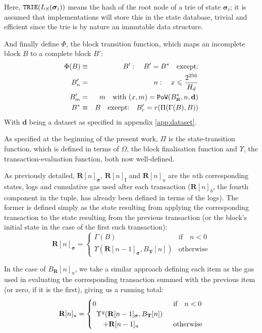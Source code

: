 \documentclass[9pt,oneside]{amsart}
\newcommand{\hcancel}[1]{%
    \tikz[baseline=(tocancel.base)]{
        \node[inner sep=0pt,outer sep=0pt] (tocancel) {#1};
        \draw[black] (tocancel.south west) -- (tocancel.north east);
    }%
}%
\begin{document}
\begin{multicols}{2}
Here, $\mathtt{\small TRIE}(L_S(\boldsymbol{\sigma}_i))$ means the hash of the root node of a trie of state $\boldsymbol{\sigma}_i$; it is assumed that implementations will store this in the state database, trivial and efficient since the trie is by nature an immutable data structure.

And finally define $\Phi$, the block transition function, which maps an incomplete block $B$ to a complete block $B'$:
\begin{eqnarray}
\Phi(B) & \equiv & B': \quad B' = B^* \quad \text{except:} \\
B'_n & = & n: \quad x \leqslant \frac{2^{256}}{H_d} \\
B'_m & = & m \quad \text{with } (x, m) = \mathtt{PoW}(B^*_{\hcancel{n}}, n, \mathbf{d}) \\
B^* & \equiv & B \quad \text{except:} \quad B'_r = r(\Pi(\Gamma(B), B))
\end{eqnarray}
With $\mathbf{d}$ being a dataset as specified in appendix \ref{app:dataset}.

As specified at the beginning of the present work, $\Pi$ is the state-transition function, which is defined in terms of $\Omega$, the block finalisation function and $\Upsilon$, the transaction-evaluation function, both now well-defined.

As previously detailed, $\mathbf{R}[n]_{\boldsymbol{\sigma}}$, $\mathbf{R}[n]_\mathbf{l}$ and $\mathbf{R}[n]_u$ are the $n$th corresponding states, logs and cumulative gas used after each transaction ($\mathbf{R}[n]_b$, the fourth component in the tuple, has already been defined in terms of the logs). The former is defined simply as the state resulting from applying the corresponding transaction to the state resulting from the previous transaction (or the block's initial state in the case of the first such transaction):
\begin{equation}
\mathbf{R}[n]_{\boldsymbol{\sigma}} = \begin{cases} \Gamma(B) & \text{if} \quad n < 0 \\ \Upsilon(\mathbf{R}[n - 1]_{\boldsymbol{\sigma}}, B_\mathbf{T}[n]) & \text{otherwise} \end{cases}
\end{equation}

In the case of $B_\mathbf{R}[n]_u$, we take a similar approach defining each item as the gas used in evaluating the corresponding transaction summed with the previous item (or zero, if it is the first), giving us a running total:
\begin{equation}
\mathbf{R}[n]_u = \begin{cases} 0 & \text{if} \quad n < 0 \\
\begin{array}[b]{l}
\Upsilon^g(\mathbf{R}[n - 1]_{\boldsymbol{\sigma}}, B_\mathbf{T}[n])\\ \quad + \mathbf{R}[n-1]_u
\end{array}
 & \text{otherwise} \end{cases}
\end{equation}


\end{multicols}
\end{document}
